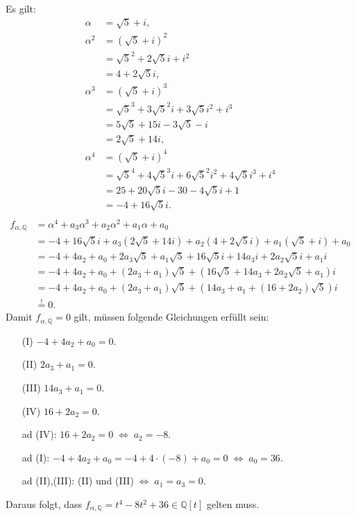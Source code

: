\documentclass[12pt]{article}
\newcommand{\gdw}{\;\Longleftrightarrow\;}
\begin{document}
\begin{enumerate}
	Es gilt:
	\begin{align*}
		\alpha&=\sqrt{5}+i, \\
		\alpha^2&=(\sqrt{5}+i)^2 \\
		&=\sqrt{5}^2+2\sqrt{5}i+i^2 \\
		&=4+2\sqrt{5}i, \\
		\alpha^3&=(\sqrt{5}+i)^3 \\
		&=\sqrt{5}^3+3\sqrt{5}^2i+3\sqrt{5}i^2+i^3 \\
		&=5\sqrt{5}+15i-3\sqrt{5}-i \\
		&=2\sqrt{5}+14i, \\
		\alpha^4&=(\sqrt{5}+i)^4 \\
		&=\sqrt{5}^4+4\sqrt{5}^3i+6\sqrt{5}^2i^2+4\sqrt{5}i^3+i^4 \\
		&=25+20\sqrt{5}i-30-4\sqrt{5}i+1 \\
		&=-4+16\sqrt{5}i. \\
	\end{align*}
	\begin{align*}		
		f_{\alpha,\mathbb{Q}}&=\alpha^4+a_3\alpha^3+a_2\alpha^2+a_1\alpha+a_0 \\
		&=-4+16\sqrt{5}i+a_3(2\sqrt{5}+14i)+a_2(4+2\sqrt{5}i)+a_1(\sqrt{5}+i)+a_0 \\
		&=-4+4a_2+a_0+2a_3\sqrt{5}+a_1\sqrt{5}+16\sqrt{5}i+14a_3i+2a_2\sqrt{5}i+a_1i \\
		&=-4+4a_2+a_0+(2a_3+a_1)\sqrt{5}+(16\sqrt{5}+14a_3+2a_2\sqrt{5}+a_1)i \\
		&=-4+4a_2+a_0+(2a_3+a_1)\sqrt{5}+(14a_3+a_1+(16+2a_2)\sqrt{5})i \\
		&\overset{!}{=}0.
	\end{align*}
	Damit $f_{\alpha,\mathbb{Q}}=0$ gilt, müssen folgende Gleichungen erfüllt sein:
	\begin{enumerate}
		\item[(I)] $-4+4a_2+a_0=0$.
		\item[(II)] $2a_3+a_1=0$.
		\item[(III)] $14a_3+a_1=0$.
		\item[(IV)] $16+2a_2=0$.\\
		
		\item[ad (IV):] $16+2a_2=0\gdw a_2=-8$.
		\item[ad (I):] $-4+4a_2+a_0=-4+4\cdot(-8)+a_0=0\gdw a_0=36$.
		\item[ad (II),(III):] (II) und (III)$\gdw a_1=a_3=0$.
	\end{enumerate}
	Daraus folgt, dass $f_{\alpha,\mathbb{Q}}=t^4-8t^2+36\in\mathbb{Q}[t]$ gelten muss. \\
	

\end{enumerate}
\end{document}
